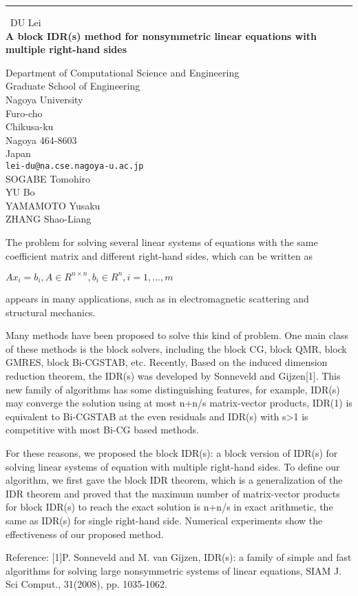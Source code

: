 \documentclass{report}
\begin{document}
\begin{center}
\rule{6in}{1pt} \
{\large DU Lei \\
{\bf A block IDR(s) method for nonsymmetric linear equations with multiple right-hand sides}}

Department of Computational Science and Engineering \\ Graduate School of Engineering \\ Nagoya University \\ Furo-cho \\ Chikusa-ku \\ Nagoya 464-8603 \\ Japan
\\
{\tt lei-du@na.cse.nagoya-u.ac.jp}\\
SOGABE Tomohiro\\
YU Bo\\
YAMAMOTO Yusaku\\
ZHANG Shao-Liang\end{center}

The problem for solving several linear systems of equations with the same
coefficient matrix and different right-hand sides, which can be written
as

$Ax_i=b_i, A\in R^{n\times n}, b_i\in R^n, i=1,...,m$

appears in many applications, such as in electromagnetic scattering and
structural mechanics.

Many methods have been proposed to solve this kind of problem. One main
class of these methods is the block solvers, including the block CG,
block QMR, block GMRES, block Bi-CGSTAB, etc.
Recently, Based on the induced dimension reduction theorem, the IDR(s)
was developed by Sonneveld and Gijzen[1]. This new family of algorithms
has some distinguishing features, for example, IDR(s) may converge the
solution using at most n+n/s matrix-vector products, IDR(1) is equivalent
to Bi-CGSTAB at the even residuals and IDR(s) with s>1 is competitive
with most Bi-CG based methods.

For these reasons, we proposed the block IDR(s): a block version of
IDR(s) for solving linear systems of equation with multiple right-hand
sides. To define our algorithm, we first gave the block IDR theorem,
which is a generalization of the IDR theorem and proved that the maximum
number of matrix-vector products for block IDR(s) to reach the exact
solution is n+n/s in exact arithmetic, the same as IDR(s) for single
right-hand side. Numerical experiments show the effectiveness of our
proposed method.

Reference:
[1]P. Sonneveld and M. van Gijzen, IDR(s): a family of simple and fast
algorithms for solving large nonsymmetric systems of linear equations,
SIAM J. Sci Comput., 31(2008), pp. 1035-1062.
\end{document}
